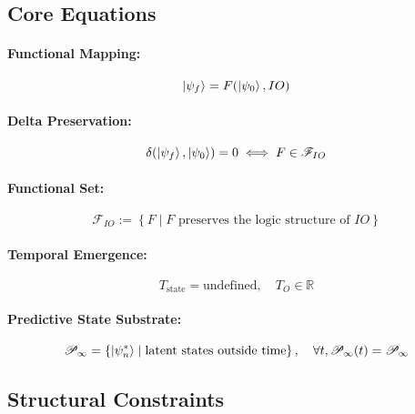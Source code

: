 \documentclass[12pt]{article}
\begin{document}
\subsection{Core Equations}

\paragraph{Functional Mapping:}
\begin{equation}
\ket{\psi_f} = F(\ket{\psi_0}, IO)
\end{equation}

\paragraph{Delta Preservation:}
\begin{equation}
\delta(\ket{\psi_f}, \ket{\psi_0}) = 0 \iff F \in \mathscr{F}_{IO}
\end{equation}

\paragraph{Functional Set:}
\begin{equation}
\mathscr{F}_{IO} := \left\{ F \mid F \text{ preserves the logic structure of } IO \right\}
\end{equation}

\paragraph{Temporal Emergence:}
\begin{equation}
T_{\text{state}} = \text{undefined}, \quad T_O \in \mathbb{R}
\end{equation}

\paragraph{Predictive State Substrate:}
\begin{equation}
\mathscr{P}_\infty = \left\{ \ket{\psi^*_n} \mid \text{latent states outside time} \right\}, \quad \forall t, \mathscr{P}_\infty(t) = \mathscr{P}_\infty
\end{equation}

\subsection{Structural Constraints}
\end{document}
